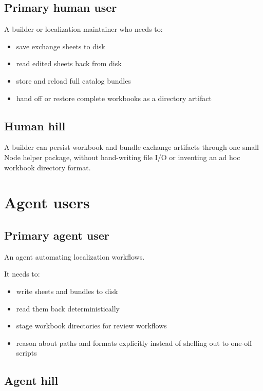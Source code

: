 \subsection{Primary human user}\label{record-192-primary-human-user}

A builder or localization maintainer who needs to:

\begin{itemize}
\tightlist
\item
  save exchange sheets to disk
\item
  read edited sheets back from disk
\item
  store and reload full catalog bundles
\item
  hand off or restore complete workbooks as a directory artifact
\end{itemize}

\subsection{Human hill}\label{record-192-human-hill}

A builder can persist workbook and bundle exchange artifacts through one small Node helper package, without hand-writing file I/O or inventing an ad hoc workbook directory format.

\section{Agent users}\label{record-192-agent-users}

\subsection{Primary agent user}\label{record-192-primary-agent-user}

An agent automating localization workflows.

It needs to:

\begin{itemize}
\tightlist
\item
  write sheets and bundles to disk
\item
  read them back deterministically
\item
  stage workbook directories for review workflows
\item
  reason about paths and formats explicitly instead of shelling out to one-off scripts
\end{itemize}

\subsection{Agent hill}\label{record-192-agent-hill}

